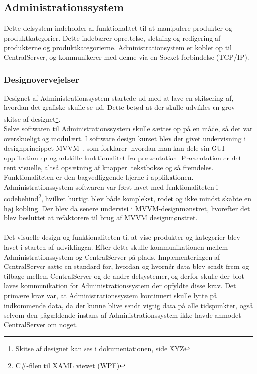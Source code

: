 \subsection{Administrationssystem}
Dette delsystem indeholder al funktionalitet til at manipulere produkter og produktkategorier. Dette indebærer oprettelse, sletning og redigering af produkterne og produktkategorierne. Administrationsystem er koblet op til CentralServer, og kommunikerer med denne via en Socket forbindelse (TCP/IP).

\subsubsection{Designovervejelser}
Designet af Administrationssystem startede ud med at lave en skitsering af, hvordan det grafiske skulle se ud. Dette betød at der skulle udvikles en grov skitse af designet\footnote{Skitse af designet kan ses i dokumentationen, side XYZ}.\\
Selve softwaren til Administrationssystem skulle sættes op på en måde, så det var overskueligt og modulært. I software design kurset blev der givet undervisning i designprincippet MVVM~\cite{MVVM}, som forklarer, hvordan man kan dele sin GUI-applikation op og adskille funktionalitet fra præsentation. Præsentation er det rent visuelle, altså opsætning af knapper, tekstbokse og så fremdeles. Funktionaliteten er den bagvedliggende hjerne i applikationen.\\
Administrationssystem softwaren var først lavet med funktionaliteten i codebehind\footnote{C\#-filen til XAML viewet (WPF)}, hvilket hurtigt blev både komplekst, rodet og ikke mindst skabte en høj kobling. Der blev da senere undervist i MVVM-designmønstret, hvorefter det blev besluttet at refaktorere til brug af MVVM designmønstret.\\\\

Det visuelle design og funktionaliteten til at vise produkter og kategorier blev lavet i starten af udviklingen. Efter dette skulle kommunikationen mellem Administrationssystem og CentralServer på plads. Implementeringen af CentralServer satte en standard for, hvordan og hvornår data blev sendt frem og tilbage mellem CentralServer og de andre delsystemer, og derfor skulle der blot laves kommunikation for Administrationssystem der opfyldte disse krav. Det primære krav var, at Administrationssystem kontinuert skulle lytte på indkommende data, da der kunne blive sendt vigtig data på alle tidspunkter, også selvom den pågældende instans af Administrationssystem ikke havde anmodet CentralServer om noget.


